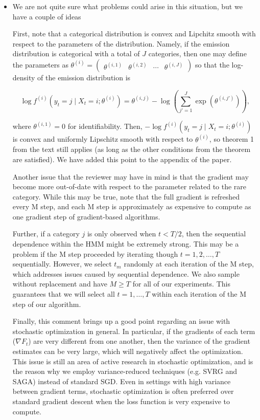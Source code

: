 \documentclass[11pt]{article}
\begin{document}
\begin{itemize}
    \item We are not quite sure what problems could arise in this situation, but we have a couple of ideas 
    
    First, note that a categorical distribution is convex and Lipchitz smooth with respect to the parameters of the distribution. Namely, if the emission distribution is categorical with a total of $J$ categories, then one may define the parameters as $\theta^{(i)} = \begin{pmatrix} \theta^{(i,1)} & \theta^{(i,2)} & \cdots & \theta^{(i,J)} \end{pmatrix}$ so that the log-density of the emission distribution is
    
    $$\log f^{(i)}(y_t = j \mid X_t = i ; \theta^{(i)}) = \theta^{(i,j)} - {\log \left(\sum_{j' = 1}^{J} \exp(\theta^{(i,j')})\right)},$$ 
    
    where $\theta^{(i,1)} = 0$ for identifiability. Then, $-\log f^{(i)}(y_t = j \mid X_t = i ; \theta^{(i)})$ is convex and uniformly Lipschitz smooth with respect to $\theta^{(i)}$, so theorem 1 from the text still applies (as long as the other conditions from the theorem are satisfied). We have added this point to the appendix of the paper.
    
    Another issue that the reviewer may have in mind is that the gradient may become more out-of-date with respect to the parameter related to the rare category. While this may be true, note that the full gradient is refreshed every M step, and each M step is approximately as expensive to compute as one gradient step of gradient-based algorithms.
    
    Further, if a category $j$ is only observed when $t < T/2$, then the sequential dependence within the HMM might be extremely strong. This may be a problem if the M step proceeded by iterating though $t = 1,2,\ldots,T$ sequentially. However, we select $t_m$ randomly at each iteration of the M step, which addresses issues caused by sequential dependence. We also sample without replacement and have $M \geq T$ for all of our experiments. This guarantees that we will select all $t = 1,\ldots,T$ within each iteration of the M step of our algorithm.
    
    Finally, this comment brings up a good point regarding an issue with stochastic optimization in general. In particular, if the gradients of each term ($\nabla F_t$) are very different from one another, then the variance of the gradient estimates can be very large, which will negatively affect the optimization. This issue is still an area of active research in stochastic optimization, and is the reason why we employ variance-reduced techniques (e.g. SVRG and SAGA) instead of standard SGD. Even in settings with high variance between gradient terms, stochastic optimization is often preferred over standard gradient descent when the loss function is very expensive to compute.
\end{itemize}
\end{document}
